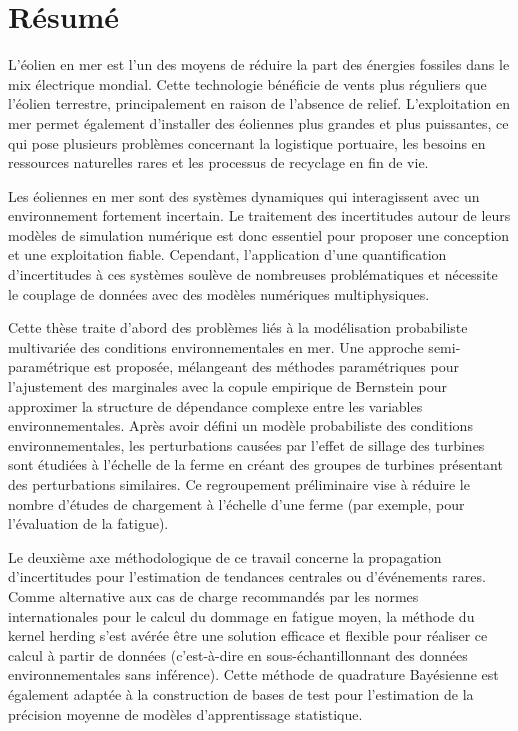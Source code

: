 \cleardoublepage
\setsinglecolumn
\chapter*{\centering \Large Résumé}
\thispagestyle{empty}

{
\footnotesize
L'éolien en mer est l'un des moyens de réduire la part des énergies fossiles dans le mix électrique mondial. 
Cette technologie bénéficie de vents plus réguliers que l'éolien terrestre, principalement en raison de l'absence de relief. 
L'exploitation en mer permet également d'installer des éoliennes plus grandes et plus puissantes, ce qui pose plusieurs problèmes concernant la logistique portuaire, les besoins en ressources naturelles rares et les processus de recyclage en fin de vie.

Les éoliennes en mer sont des systèmes dynamiques qui interagissent avec un environnement fortement incertain. 
Le traitement des incertitudes autour de leurs modèles de simulation numérique est donc essentiel pour proposer une conception et une exploitation fiable. 
Cependant, l'application d'une quantification d'incertitudes à ces systèmes soulève de nombreuses problématiques et nécessite le couplage de données avec des modèles numériques multiphysiques.

Cette thèse traite d'abord des problèmes liés à la modélisation probabiliste multivariée des conditions environnementales en mer. 
Une approche semi-paramétrique est proposée, mélangeant des méthodes paramétriques pour l'ajustement des marginales avec la copule empirique de Bernstein pour approximer la structure de dépendance complexe entre les variables environnementales. 
Après avoir défini un modèle probabiliste des conditions environnementales, les perturbations causées par l'effet de sillage des turbines sont étudiées à l'échelle de la ferme en créant des groupes de turbines présentant des perturbations similaires. 
Ce regroupement préliminaire vise à réduire le nombre d'études de chargement à l'échelle d'une ferme (par exemple, pour l'évaluation de la fatigue).

Le deuxième axe méthodologique de ce travail concerne la propagation d'incertitudes pour l'estimation de tendances centrales ou d'événements rares. 
Comme alternative aux cas de charge recommandés par les normes internationales pour le calcul du dommage en fatigue moyen, la méthode du kernel herding s'est avérée être une solution efficace et flexible pour réaliser ce calcul à partir de données (c'est-à-dire en sous-échantillonnant des données environnementales sans inférence). 
Cette méthode de quadrature Bayésienne est également adaptée à la construction de bases de test pour l'estimation de la précision moyenne de modèles d'apprentissage statistique.

}
